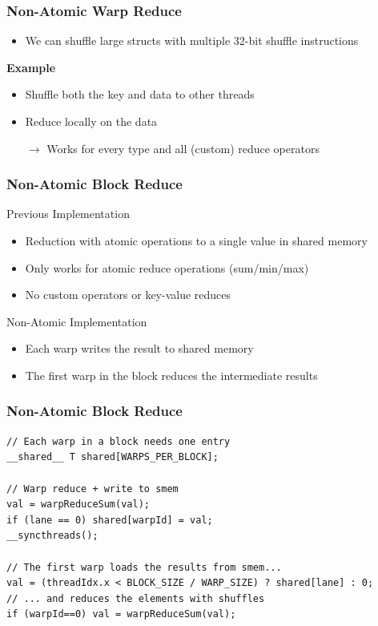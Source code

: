 \documentclass[aspectratio=169,handout]{beamer}
\begin{document}
\frame
{	
	\frametitle{Non-Atomic Warp Reduce}

	\begin{itemize}
		\item We can shuffle large structs with multiple 32-bit shuffle instructions
	\end{itemize}
	\textbf{Example}
	\begin{itemize}
	\item Shuffle both the key and data to other threads
	\item Reduce locally on the data
	\item[$\rightarrow$] Works for every type and all (custom) reduce operators
	
\end{itemize}	

}

\begin{frame}[fragile]
\frametitle{Non-Atomic Block Reduce}
Previous Implementation
\begin{itemize}
	\item Reduction with atomic operations to a single value in shared memory
		\item<2->[$\rightarrow$] Only works for atomic reduce operations (sum/min/max)
		\item<3->[$\rightarrow$] No custom operators or key-value reduces
\end{itemize}
Non-Atomic Implementation
\begin{itemize}
	\item<5-> Each warp writes the result to shared memory
	\item<6-> The first warp in the block reduces the intermediate results 
\end{itemize}



\end{frame}


\begin{frame}[fragile]
\frametitle{Non-Atomic Block Reduce}
\label{sl:nabr}

\begin{lstlisting}
// Each warp in a block needs one entry
__shared__ T shared[WARPS_PER_BLOCK];

// Warp reduce + write to smem
val = warpReduceSum(val);
if (lane == 0) shared[warpId] = val;
__syncthreads();

// The first warp loads the results from smem...
val = (threadIdx.x < BLOCK_SIZE / WARP_SIZE) ? shared[lane] : 0;
// ... and reduces the elements with shuffles
if (warpId==0) val = warpReduceSum(val); 
\end{lstlisting}
\end{frame}
\end{document}
